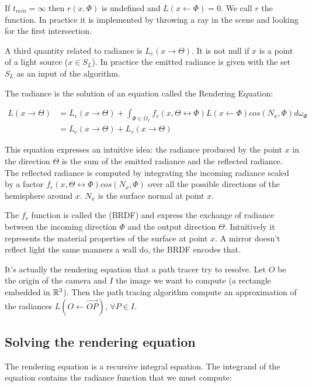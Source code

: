 If $t_{min} = \infty$ then $r(x, \Phi)$ is undefined and $L(x \leftarrow \Phi) = 0$. We call $r$ the  function. In practice it is implemented by throwing a ray in the scene and looking for the first intersection.

A third quantity related to radiance is  $L_e(x \rightarrow \Theta)$. It is not null if $x$ is a point of a light source ($x \in S_L$). In practice the emitted radiance is given with the set $S_L$ as an input of the algorithm.

The radiance is the solution of an equation called the Rendering Equation:

\begin{align*}
L(x \rightarrow \Theta) &= L_e(x \rightarrow \Theta) + \int_{\Phi \in \Omega_x} f_r(x, \Theta \leftrightarrow \Phi) L(x \leftarrow \Phi) cos(N_x, \Phi) d\omega_\Phi \\
&= L_e(x \rightarrow \Theta) + L_r(x \rightarrow \Theta)
\end{align*}

This equation expresses an intuitive idea: the radiance produced by the point $x$ in the direction $\Theta$ is the sum of the emitted radiance and the reflected radiance.  The reflected radiance is computed by integrating the incoming radiance scaled by a factor $f_r(x, \Theta \leftrightarrow \Phi) cos(N_x, \Phi)$ over all the possible directions of the hemisphere around $x$. $N_x$ is the surface normal at point $x$.

The $f_r$ function is called the  (BRDF) and express the exchange of radiance between the incoming direction $\Phi$ and the output direction $\Theta$. Intuitively it represents the material properties of the surface at point $x$. A mirror doesn't reflect light the same manners a wall do, the BRDF encodes that.

It's actually the rendering equation that a path tracer try to resolve. Let $O$ be the origin of the camera and $I$ the image we want to compute (a rectangle embedded in $\mathbb{R}^3$). Then the path tracing algorithm compute an approximation of the radiances $L(O \leftarrow \vec{OP})$, $\forall P \in I$.

\subsection{Solving the rendering equation}

The rendering equation is a recursive integral equation. The integrand of the equation contains the radiance function that we must compute:

